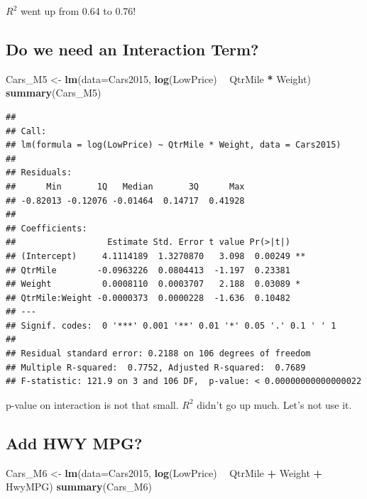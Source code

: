 \documentclass[]{book}
\newenvironment{Shaded}{\begin{snugshade}}{\end{snugshade}}
\newcommand{\KeywordTok}[1]{\textcolor[rgb]{0.13,0.29,0.53}{\textbf{#1}}}
\newcommand{\DataTypeTok}[1]{\textcolor[rgb]{0.13,0.29,0.53}{#1}}
\newcommand{\StringTok}[1]{\textcolor[rgb]{0.31,0.60,0.02}{#1}}
\newcommand{\OperatorTok}[1]{\textcolor[rgb]{0.81,0.36,0.00}{\textbf{#1}}}
\newcommand{\NormalTok}[1]{#1}
\begin{document}
\(R^2\) went up from 0.64 to 0.76!

\subsection{Do we need an Interaction
Term?}\label{do-we-need-an-interaction-term}

\begin{Shaded}
\begin{Highlighting}[]
\NormalTok{Cars_M5 <-}\StringTok{ }\KeywordTok{lm}\NormalTok{(}\DataTypeTok{data=}\NormalTok{Cars2015, }\KeywordTok{log}\NormalTok{(LowPrice) }\OperatorTok{~}\StringTok{ }\NormalTok{QtrMile }\OperatorTok{*}\StringTok{ }\NormalTok{Weight)}
\KeywordTok{summary}\NormalTok{(Cars_M5)}
\end{Highlighting}
\end{Shaded}

\begin{verbatim}
## 
## Call:
## lm(formula = log(LowPrice) ~ QtrMile * Weight, data = Cars2015)
## 
## Residuals:
##      Min       1Q   Median       3Q      Max 
## -0.82013 -0.12076 -0.01464  0.14717  0.41928 
## 
## Coefficients:
##                  Estimate Std. Error t value Pr(>|t|)   
## (Intercept)     4.1114189  1.3270870   3.098  0.00249 **
## QtrMile        -0.0963226  0.0804413  -1.197  0.23381   
## Weight          0.0008110  0.0003707   2.188  0.03089 * 
## QtrMile:Weight -0.0000373  0.0000228  -1.636  0.10482   
## ---
## Signif. codes:  0 '***' 0.001 '**' 0.01 '*' 0.05 '.' 0.1 ' ' 1
## 
## Residual standard error: 0.2188 on 106 degrees of freedom
## Multiple R-squared:  0.7752, Adjusted R-squared:  0.7689 
## F-statistic: 121.9 on 3 and 106 DF,  p-value: < 0.00000000000000022
\end{verbatim}

p-value on interaction is not that small. \(R^2\) didn't go up much.
Let's not use it.

\subsection{Add HWY MPG?}\label{add-hwy-mpg}

\begin{Shaded}
\begin{Highlighting}[]
\NormalTok{Cars_M6 <-}\StringTok{ }\KeywordTok{lm}\NormalTok{(}\DataTypeTok{data=}\NormalTok{Cars2015, }\KeywordTok{log}\NormalTok{(LowPrice) }\OperatorTok{~}\StringTok{ }\NormalTok{QtrMile }\OperatorTok{+}\StringTok{ }\NormalTok{Weight }\OperatorTok{+}\StringTok{ }\NormalTok{HwyMPG)}
\KeywordTok{summary}\NormalTok{(Cars_M6)}
\end{Highlighting}
\end{Shaded}
\end{document}
